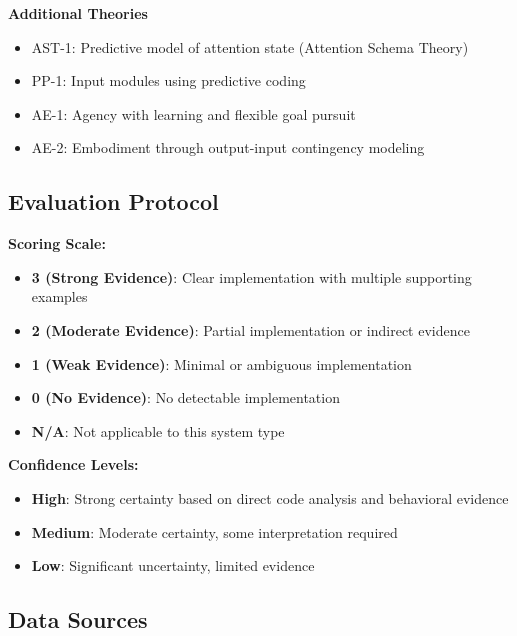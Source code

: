 \documentclass[12pt,a4paper]{article}
\begin{document}
\textbf{Additional Theories}
\begin{itemize}
    \item AST-1: Predictive model of attention state (Attention Schema Theory)
    \item PP-1: Input modules using predictive coding
    \item AE-1: Agency with learning and flexible goal pursuit
    \item AE-2: Embodiment through output-input contingency modeling
\end{itemize}

\subsection{Evaluation Protocol}

\textbf{Scoring Scale:}
\begin{itemize}
    \item \textbf{3 (Strong Evidence)}: Clear implementation with multiple supporting examples
    \item \textbf{2 (Moderate Evidence)}: Partial implementation or indirect evidence
    \item \textbf{1 (Weak Evidence)}: Minimal or ambiguous implementation
    \item \textbf{0 (No Evidence)}: No detectable implementation
    \item \textbf{N/A}: Not applicable to this system type
\end{itemize}

\textbf{Confidence Levels:}
\begin{itemize}
    \item \textbf{High}: Strong certainty based on direct code analysis and behavioral evidence
    \item \textbf{Medium}: Moderate certainty, some interpretation required
    \item \textbf{Low}: Significant uncertainty, limited evidence
\end{itemize}

\subsection{Data Sources}
\end{document}
